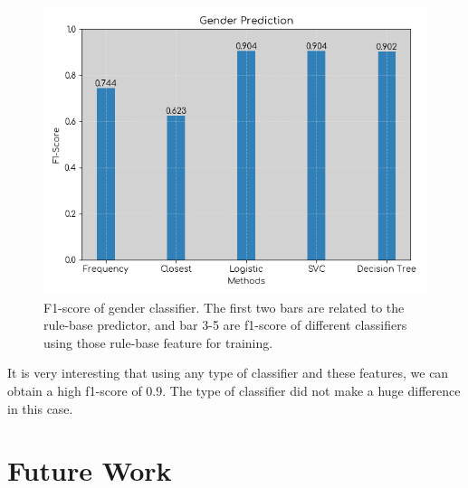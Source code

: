 \documentclass[letterpaper]{article}
\begin{document}
\begin{figure}
	\centering
	\includegraphics[scale=.60]{gender_prediction.png}
	\caption{F1-score of gender classifier. The first two bars are related to the rule-base predictor, and bar 3-5 are f1-score of different classifiers using those rule-base feature for training.}
	\label{fig:gender}
\end{figure}


It is very interesting that using any type of classifier and these features, we can obtain a high f1-score of $0.9$. The type of classifier did not make a huge difference in this case.





\section{Future Work}





\end{document}
